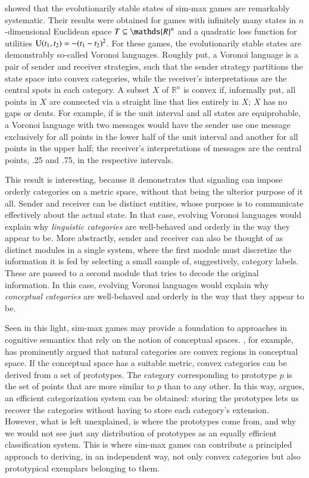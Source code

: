 \documentclass[fleqn,reqno,10pt]{article}
\begin{document}
\citet{JagerMetzger2011:Voronoi-Languag} showed that the
evolutionarily stable states of sim-max games are remarkably
systematic. Their results were obtained for games with infinitely many
states in $n$-dimensional Euclidean space $\States \subseteq
\mathds{R}^n$ and a quadratic loss function for utilities
$\mathrm{U}(t_{\mathrm{1}}, t_{\mathrm{2}}) = - (t_{\mathrm{1}} -
t_{\mathrm{2}})^2$. For these games, the evolutionarily stable states are
demonstrably so-called Voronoi languages. Roughly put, a Voronoi
language is a pair of sender and receiver strategies, such that the
sender strategy partitions the state space into convex categories,
while the receiver's interpretations are the central spots in each
category. A subset $X$ of $\mathds{R}^n$ is convex if, informally put,
all points in $X$ are connected via a straight line that lies entirely
in $X$; $X$ has no gaps or dents. For example, if \States is the unit
interval and all states are equiprobable, a Voronoi language with two
messages would have the sender use one message exclusively for all
points in the lower half of the unit interval and another for all
points in the upper half; the receiver's interpretations of messages
are the central points, .25 and .75, in the respective intervals.

This result is interesting, because it demonstrates that signaling can
impose orderly categories on a metric space, without that being the
ulterior purpose of it all. Sender and receiver can be distinct
entities, whose purpose is to communicate effectively about the actual
state. In that case, evolving Voronoi languages would explain why
\emph{linguistic categories} are well-behaved and orderly in the way
they appear to be. More abstractly, sender and receiver can also be
thought of as distinct modules in a single system, where the first
module must discretize the information it is fed by selecting a small
sample of, suggestively, category labels. These are passed to a second
module that tries to decode the original information. In this case,
evolving Voronoi languages would explain why \emph{conceptual
  categories} are well-behaved and orderly in the way that they appear
to be.

Seen in this light, sim-max games may provide a foundation to
approaches in cognitive semantics that rely on the notion of
conceptual spaces.  \citet[][70--77]{Gardenfors2000:Conceptual-Spac},
for example, has prominently argued that natural categories are convex
regions in conceptual space. If the conceptual space has a suitable
metric, convex categories can be derived from a set of prototypes. The
category corresponding to prototype $p$ is the set of points that are
more similar to $p$ than to any other. In this way,
\citet{Gardenfors2000:Conceptual-Spac} argues, an efficient
categorization system can be obtained: storing the prototypes lets us
recover the categories without having to store each category's
extension. However, what is left unexplained, is where the prototypes
come from, and why we would not see just any distribution of
prototypes as an equally efficient classification system. This is
where sim-max games can contribute a principled approach to deriving,
in an independent way, not only convex categories but also
prototypical exemplars belonging to them.
\end{document}
